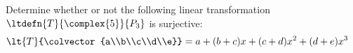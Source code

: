 Determine whether or not the following linear transformation $\ltdefn{T}{\complex{5}}{P_3}$ is surjective:
%
\begin{align*}
\lt{T}{\colvector{a\\b\\c\\d\\e}} &= a + (b + c)x + (c + d)x^2 + (d + e)x^3
\end{align*}
% 
%